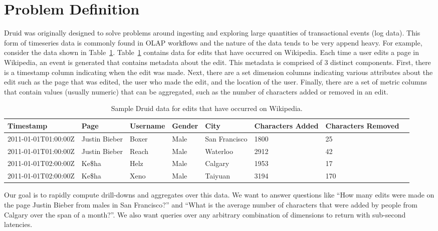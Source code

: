 \documentclass{acm_proc_article-sp}
\begin{document}
\section{Problem Definition}
\label{sec:problem-definition}

Druid was originally designed to solve problems around ingesting and exploring
large quantities of transactional events (log data). This form of timeseries
data is commonly found in OLAP workflows and the nature of the data tends to be
very append heavy. For example, consider the data shown in
Table~\ref{tab:sample_data}.  Table~\ref{tab:sample_data} contains data for
edits that have occurred on Wikipedia. Each time a user edits a page in
Wikipedia, an event is generated that contains metadata about the edit. This
metadata is comprised of 3 distinct components. First, there is a timestamp
column indicating when the edit was made. Next, there are a set dimension
columns indicating various attributes about the edit such as the page that was
edited, the user who made the edit, and the location of the user. Finally,
there are a set of metric columns that contain values (usually numeric) that
can be aggregated, such as the number of characters added or removed in an
edit. 

\begin{table}
  \centering
  \caption{Sample Druid data for edits that have occurred on Wikipedia.}
  \label{tab:sample_data}
  \begin{tabular}{| l | l | l | l | l | l | l | l |}
    \hline
    \textbf{Timestamp} & \textbf{Page} & \textbf{Username} & \textbf{Gender} & \textbf{City} & \textbf{Characters Added} & \textbf{Characters Removed} \\ \hline
    2011-01-01T01:00:00Z & Justin Bieber & Boxer & Male & San Francisco & 1800 & 25 \\ \hline
    2011-01-01T01:00:00Z & Justin Bieber & Reach & Male & Waterloo & 2912 & 42 \\ \hline
    2011-01-01T02:00:00Z & Ke\$ha & Helz & Male & Calgary & 1953 & 17 \\ \hline
    2011-01-01T02:00:00Z & Ke\$ha & Xeno & Male & Taiyuan & 3194 & 170 \\ \hline
  \end{tabular}
\end{table}

Our goal is to rapidly compute drill-downs and aggregates over this data. We
want to answer questions like “How many edits were made on the page Justin
Bieber from males in San Francisco?” and “What is the average number of
characters that were added by people from Calgary over the span of a month?”. We also
want queries over any arbitrary combination of dimensions to return with
sub-second latencies.
\end{document}
